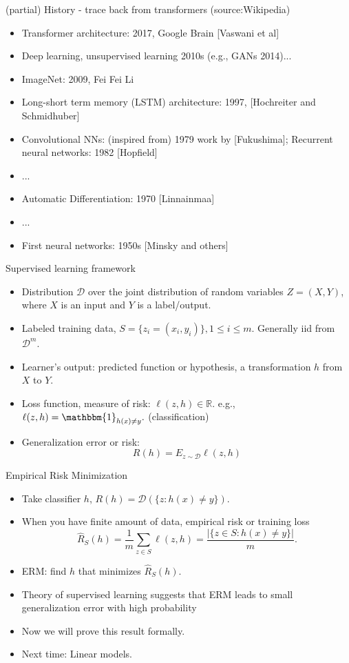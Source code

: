 \documentclass[final]{beamer}
\begin{document}
\begin{frame}{(partial) History - trace back from transformers (source:Wikipedia)}
	\begin{itemize}
		\item Transformer architecture: 2017, Google Brain [Vaswani et al]
		\item Deep learning, unsupervised learning 2010s (e.g., GANs 2014)...
		\item ImageNet: 2009, Fei Fei Li 
		\item Long-short term memory (LSTM) architecture: 1997, [Hochreiter and Schmidhuber]
		\item Convolutional NNs: (inspired from) 1979 work by [Fukushima];  Recurrent neural networks: 1982 [Hopfield]
		\item ...
		\item Automatic Differentiation: 1970 [Linnainmaa]
		\item ...
		\item First neural networks: 1950s [Minsky and others]
	\end{itemize}
\end{frame}
\begin{frame}{Supervised learning framework}
	\begin{itemize}
		\item Distribution $\mathcal{D}$ over the joint distribution of random variables $Z = (X, Y)$, where $X$ is an input and $Y$ is a label/output.
		\pause
	\item Labeled training data, $S = \{z_i = (x_i, y_i)\}, 1\leq i \leq m.$ Generally iid from $\mathcal{D}^m.$
		\pause
		\item Learner's output: predicted function or hypothesis, a transformation $h$ from $X$ to $Y$.
		\pause
	\item Loss function, measure of risk:  $\ell(z, h) \in \mathbb{R}$. e.g., $\ell(z, h) =  \mathbbm{1}_{h(x) \neq y}.$ (classification)
	\pause
	\item Generalization error or risk: 
		$$R(h) = E_{z\sim \mathcal{D}} \ell(z, h)$$
	\end{itemize}
\end{frame}
\begin{frame}{Empirical Risk Minimization}
	\begin{itemize}
		\item Take classifier $h$, $R(h) = \mathcal{D}(\{z: h(x) \neq y\}).$
		\pause
		\item When you have finite amount of data, empirical risk or training loss
		$$ \hat{R}_S(h) = \dfrac{1}{m} \sum_{z \in S} \ell(z,h) = \dfrac{|\{z \in S: h(x) \neq y\}|}{m}.$$
		\pause
	\item ERM: find $h$ that minimizes $\hat{R}_S(h).$
	\pause
	\item Theory of supervised learning suggests that ERM leads to small generalization error with high probability
	\pause
	\item Now we will prove this result formally. 
	\pause
\item Next time: Linear models.
\end{itemize}
\end{frame}
\end{document}
